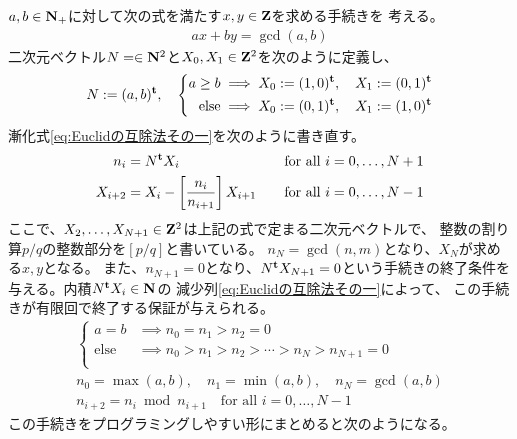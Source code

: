{	$a,b\in\mathbf{N}_+$に対して次の式を満たす$x,y\in\mathbf{Z}$を求める手続きを
	考える。
	\begin{equation*}\begin{split}
		ax + by = \gcd(a,b)
	\end{split}\end{equation*}
	二次元ベクトル$N=\in\mathbf{N}^2$と$X_0,X_1\in\mathbf{Z}^2$を次のように定義し、
	\begin{equation*}\begin{split}
		N := (a,b)^{\mathbf{t}},\quad \left\{\begin{split}
			a \ge b &\implies X_0 := (1,0)^{\mathbf{t}},\quad X_1 := (0,1)^{\mathbf{t}} \\
			\text{else} &\implies X_0 := (0,1)^{\mathbf{t}},\quad X_1 := (1,0)^{\mathbf{t}} \\
		\end{split}\right. \\
	\end{split}\end{equation*}
	漸化式\eqref{eq:Euclidの互除法その一}を次のように書き直す。
	\begin{alignat*}{2}
		n_i &= N^{\mathbf{t}} X_i &\quad &\text{for all } i=0,\dots,N+1 \\
		X_{i+2} &= X_i - \left[\frac{n_i}{n_{i+1}}\right] X_{i+1}
		&\quad &\text{for all } i = 0,\dots,N-1
	\end{alignat*}
	ここで、$X_2,\dots,X_{N+1}\in\mathbf{Z}^2$は上記の式で定まる二次元ベクトルで、
	整数の割り算$p/q$の整数部分を$[p/q]$と書いている。
	$n_N=\gcd(n,m)$となり、$X_N$が求める$x,y$となる。
	また、$n_{N+1}=0$となり、$N^{\mathbf{t}} X_{N+1}=0$という手続きの終了条件を
	与える。内積$N^{\mathbf{t}} X_i\in\mathbf{N}$の
	減少列\eqref{eq:Euclidの互除法その一}によって、
	この手続きが有限回で終了する保証が与えられる。
	\begin{equation*}\begin{split}
		\left\{\begin{split}
			a = b &\implies n_0 = n_1 > n_2=0 \\
			\text{else} &\implies n_0 > n_1 > n_2 > \cdots > n_N > n_{N+1}=0 \\
		\end{split}\right. \\
		n_0 = \max(a, b),\quad n_1 = \min(a,b),\quad n_N = \gcd(a,b) \\
		n_{i+2} = n_i \bmod n_{i+1} \quad\text{for all } i=0,\dots,N-1
	\end{split}\end{equation*}
	この手続きをプログラミングしやすい形にまとめると次のようになる。

}
